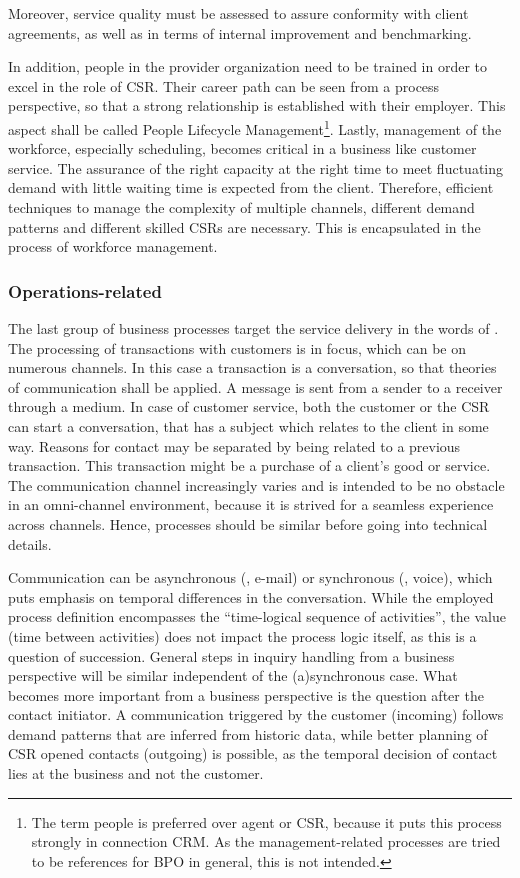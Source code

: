 	Moreover, service quality must be assessed to assure conformity with client agreements, as well as in terms of internal improvement and benchmarking. 
	
	In addition, people in the provider organization need to be trained  in order to excel in the role of \acrshort{CSR}. Their career path can be seen from a process perspective, so that a strong relationship is established with their employer. This aspect shall be called People Lifecycle Management\footnote{The term people is preferred over agent or \acrshort{CSR}, because it puts this process strongly in connection \acrshort{CRM}. As the management-related processes are tried to be references for \acrshort{BPO} in general, this is not intended.}. Lastly, management of the workforce, especially scheduling, becomes critical in a business like customer service. The assurance of the right capacity at the right time to meet fluctuating demand with little waiting time is expected from the client. Therefore, efficient techniques to manage the complexity of multiple channels, different demand patterns and different skilled \acrshort{CSR}s are necessary. This is encapsulated in the process of workforce management. 
	
	\subsubsection{Operations-related}
	The last group of business processes target the service delivery in the words of \citeauthor{schewe2007}. The processing of transactions with customers is in focus, which can be on numerous channels. In this case a transaction is a conversation, so that theories of communication \citep{shannon1949} shall be applied. A message is sent from a sender to a receiver through a medium. In case of customer service, both the customer or the \acrshort{CSR} can start a conversation, that has a subject which relates to the client in some way. Reasons for contact may be separated by being related to a previous transaction. This transaction might be a purchase of a client's good or service. The communication channel increasingly varies and is intended to be no obstacle in an omni-channel environment, because it is strived for a seamless experience across channels. Hence, processes should be similar before going into technical details. 
	
	Communication can be asynchronous (\eg, e-mail) or synchronous (\eg, voice), which puts emphasis on temporal differences in the conversation. While the employed process definition encompasses the \enquote{time-logical sequence of activities}, the value (\viz time between activities) does not impact the process logic itself, as this is a question of succession. General steps in inquiry handling from a business perspective will be similar independent of the (a)synchronous case. What becomes more important from a business perspective is the question after the contact initiator. A communication triggered by the customer (incoming) follows demand patterns that are inferred from historic data, while better planning of \acrshort{CSR} opened contacts (outgoing) is possible, as the temporal decision of contact lies at the business and not the customer. 
	
